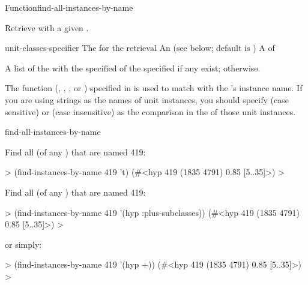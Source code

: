 \documentclass[10pt,twoside,english,pdftex]{article}
\begin{document}
\begin{functiondoc}{Function}{find-all-instances-by-name}%
  {
    }
%
%
%

\fnsyntax

\fnpurpose Retrieve  with a given .

\fnpackage {}

\fnmodule {}

\fnargs
\begin{args}{unit-classes-specifier}
 The  for the retrieval
 An 
(see below; default is )
 A  of 
\end{args}

\fnreturns A list of the  with the specified
 of the specified  if any exist; \nil{} otherwise.

\fndsyntax
\W\supp\tabletop
\unitclassspec
\subclassingspec

\fndescription The  function
(, , , or )
specified in  is used to match
 with the 's instance name.
If you are using strings as the names of unit instances, you should specify
 (case sensitive) or  (case
insensitive) as the comparison  in the  of
those unit instances.

\begin{alsos}{find-all-instances-by-name}
\end{alsos}

\fnexamples
Find all  (of any ) that are named
419:
%
\W\supp
\begin{example}
  > (find-instances-by-name 419 't)
  (#<hyp 419 (1835 4791) 0.85 [5..35]>)
  >
\end{example}
%
Find all  (of any ) that are named
419:
%
\W\supp\notpretop
\begin{example}
  > (find-instances-by-name 419 '(hyp :plus-subclasses))
  (#<hyp 419 (1835 4791) 0.85 [5..35]>)
  >
\end{example}
%
or simply:
%
\W\supp\notpretop
\begin{example}
  > (find-instances-by-name 419 '(hyp +))
  (#<hyp 419 (1835 4791) 0.85 [5..35]>)
  >
\end{example}

\end{functiondoc}
\end{document}
